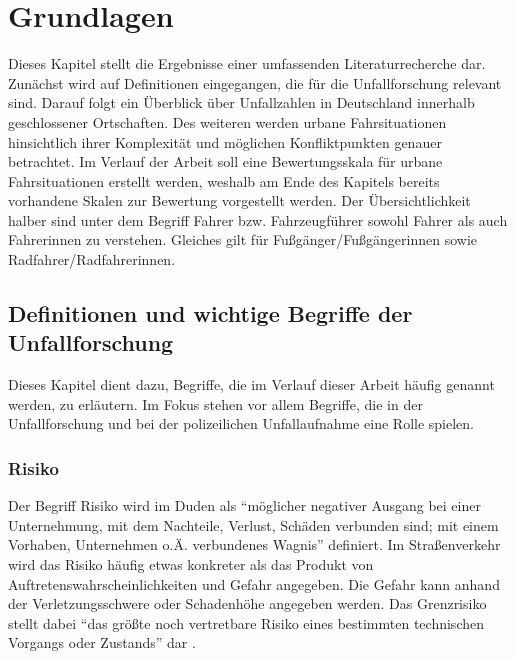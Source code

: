 
\chapter{Grundlagen}\label{chapter:Literaturrecherche}
Dieses Kapitel stellt die Ergebnisse einer umfassenden Literaturrecherche dar. Zunächst wird auf Definitionen eingegangen, die für die Unfallforschung relevant sind. Darauf folgt ein Überblick über Unfallzahlen in Deutschland innerhalb geschlossener Ortschaften. Des weiteren werden urbane Fahrsituationen hinsichtlich ihrer Komplexität und möglichen Konfliktpunkten genauer betrachtet. Im Verlauf der Arbeit soll eine Bewertungsskala für urbane Fahrsituationen erstellt werden, weshalb am Ende des Kapitels bereits vorhandene Skalen zur Bewertung vorgestellt werden. Der Übersichtlichkeit halber sind unter dem Begriff Fahrer bzw. Fahrzeugführer sowohl Fahrer als auch Fahrerinnen zu verstehen. Gleiches gilt für Fußgänger/Fußgängerinnen sowie Radfahrer/Radfahrerinnen.

\section{Definitionen und wichtige Begriffe der Unfallforschung}
Dieses Kapitel dient dazu, Begriffe, die im Verlauf dieser Arbeit häufig genannt werden, zu erläutern. Im Fokus stehen vor allem  Begriffe, die in der Unfallforschung und bei der polizeilichen Unfallaufnahme eine Rolle spielen.


\subsection{Risiko}
Der Begriff Risiko wird im Duden als \enquote{möglicher negativer Ausgang bei einer Unternehmung, mit dem Nachteile, Verlust, Schäden verbunden sind; mit einem Vorhaben, Unternehmen o.Ä. verbundenes Wagnis} definiert. Im Straßenverkehr wird das Risiko häufig etwas konkreter als das Produkt von Auftretenswahrscheinlichkeiten und Gefahr angegeben. Die Gefahr kann anhand der Verletzungsschwere \parencite[S. 151f.]{Huguenin.2017} oder Schadenhöhe \parencite[S. 60]{Gschwendtner.2015} angegeben werden. Das Grenzrisiko stellt dabei \enquote{das größte noch vertretbare Risiko eines bestimmten technischen Vorgangs oder Zustands} dar \parencite[S. 43]{Hillenbrand.2012}.

